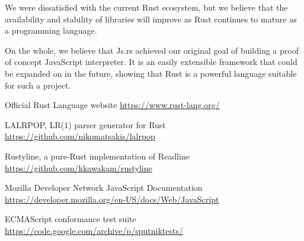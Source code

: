 \documentclass{article}
\begin{document}
\begin{multicols}{2}
We were dissatisfied with the current Rust ecosystem, but we believe that the
availability and stability of libraries will improve as Rust continues to mature
as a programming language. \newline

On the whole, we believe that Js.rs achieved our original goal of building a
proof of concept JavaScript interpreter. It is an easily extensible framework
that could be expanded on in the future, showing that Rust is a powerful
language suitable for such a project.

\end{multicols}

\pagebreak

\begin{thebibliography}{9}
  Official Rust Language website
  \href{https://www.rust-lang.org/}{https://www.rust-lang.org/}

  LALRPOP, LR(1) parser generator for Rust
  \href{https://github.com/nikomatsakis/lalrpop}{https://github.com/nikomatsakis/lalrpop}

  Rustyline, a pure-Rust implementation of Readline\\
  \href{https://github.com/kkawakam/rustyline}{https://github.com/kkawakam/rustyline}

  Mozilla Developer Network JavaScript Documentation
  \href{https://developer.mozilla.org/en-US/docs/Web/JavaScript}{https://developer.mozilla.org/en-US/docs/Web/JavaScript}

  ECMAScript conformance test suite
  \href{https://code.google.com/archive/p/sputniktests/}{https://code.google.com/archive/p/sputniktests/}
\end{thebibliography}
\end{document}
